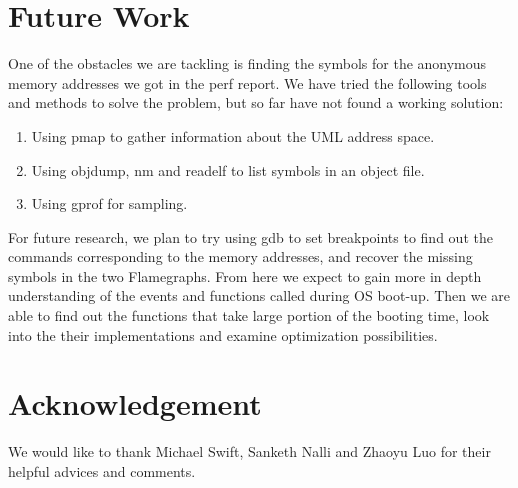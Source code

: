 \section{Future Work}
\label{sec:future}
One of the obstacles we are tackling is finding the symbols for the anonymous memory addresses we got in the perf report. We have tried the following tools and methods to solve the problem, but so far have not found a working solution:
\begin{enumerate}[(1)]
\item
Using pmap to gather information about the UML address space.
\item
Using objdump, nm and readelf to list symbols in an object file.
\item
Using gprof for sampling.
\end{enumerate}
For future research, we plan to try using gdb to set breakpoints to find out the commands corresponding to the memory addresses, and recover the missing symbols in the two Flamegraphs. From here we expect to gain more in depth understanding of the events and functions called during OS boot-up. Then we are able to find out the functions that take large portion of the booting time, look into the their implementations and examine optimization possibilities.


\section{Acknowledgement}
We would like to thank Michael Swift, Sanketh Nalli and Zhaoyu Luo for their helpful advices and comments. 


